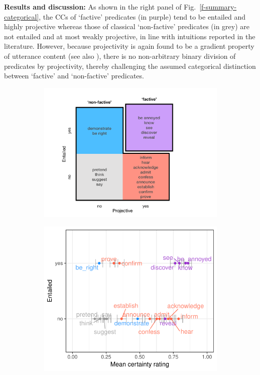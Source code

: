 \documentclass[12pt,fleqn]{article}
\newcommand{\6}{\mbox{$[\hspace*{-.6mm}[$}}
\newcommand{\9}{\mbox{$]\hspace*{-.6mm}]$}}
\begin{document}
{\bf Results and discussion:} As shown in the right panel of Fig.\ \ref{f-summary-categorical}, the CCs of `factive' predicates (in purple) tend to be entailed and highly projective whereas those of classical `non-factive' predicates (in grey) are not entailed and at most weakly projective, in line with intuitions reported in the literature. However, because projectivity is again found to be a gradient property of utterance content (see also \cite{tbd-variability}), there is no non-arbitrary binary division of predicates by projectivity,  thereby challenging the assumed categorical distinction between `factive' and `non-factive' predicates. 
\vspace{-1em}
\begin{figure}
\begin{subfigure}{.35\textwidth}
\centering
\includegraphics[width=.27\paperwidth]{../paper/figures/categorization}
\end{subfigure} %
\begin{subfigure}{.3\textwidth}
\centering
\includegraphics[width=.3\paperwidth]{../results/5-projectivity-no-fact/graphs/projection-by-inferenceEntailment}
\end{subfigure}


\end{figure}
\end{document}

